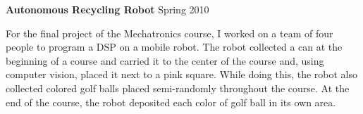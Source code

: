 	\textbf{Autonomous Recycling Robot} \hfill Spring 2010
	\begin{description}
	\item For the final project of the Mechatronics course, I worked
	on a team of four people to program a DSP on a mobile robot. The robot
	collected a can at the beginning of a course and carried it to the
	center of the course and, using computer vision, placed it next to
	a pink square. While doing this, the robot also collected colored
	golf balls placed semi-randomly throughout the course. At the end of
	the course, the robot deposited each color of golf ball in its own area.
	\end{description}
